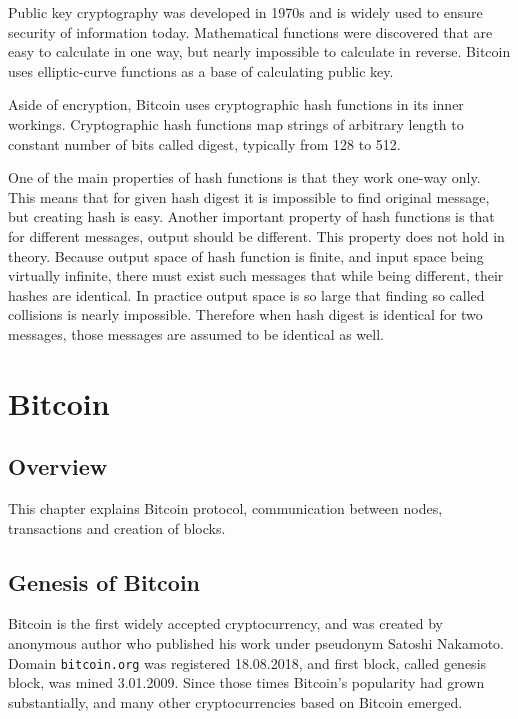 \documentclass[12pt, en, eng, oneside]{mgr}
\begin{document}
Public key cryptography was developed in 1970s and is widely used to ensure security of information today. Mathematical functions were discovered that are easy to calculate in one way, but nearly impossible to calculate in reverse. Bitcoin uses elliptic-curve functions as a base of calculating public key.\cite{bartek}

Aside of encryption, Bitcoin uses cryptographic hash functions in its inner workings. Cryptographic hash functions map strings of arbitrary length to constant number of bits called digest, typically from 128 to 512. 

One of the main properties of hash functions is that they work one-way only. This means that for given hash digest it is impossible to find original message, but creating hash is easy. Another important property of hash functions is that for different messages, output should be different. This property does not hold in theory. Because output space of hash function is finite, and input space being virtually infinite, there must exist such messages that while being different, their hashes are identical. In practice output space is so large that finding so called collisions is nearly impossible. Therefore when hash digest is identical for two messages, those messages are assumed to be identical as well.  \cite{hash-functions}


\chapter{Bitcoin}

\section{Overview}

This chapter explains Bitcoin protocol, communication between nodes, transactions and creation of blocks.

\section{Genesis of Bitcoin}
Bitcoin is the first widely accepted cryptocurrency, and was created by anonymous author who published his work under pseudonym Satoshi Nakamoto. Domain \texttt{bitcoin.org} was registered 18.08.2018, and first block, called genesis block, was mined 3.01.2009. Since those times Bitcoin's popularity had grown substantially, and many other cryptocurrencies based on Bitcoin emerged. \cite{bitcoin-history}
\end{document}
